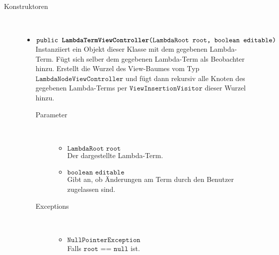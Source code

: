 \begin{description}
\item[Konstruktoren] \hfill \\
	\vspace{-.8cm}
	\begin{itemize}
		\item $\texttt{public \textbf{LambdaTermViewController}(LambdaRoot root, boolean editable)}$ \\ Instanziiert ein Objekt dieser Klasse mit dem gegebenen Lambda-Term. Fügt sich selber dem gegebenen Lambda-Term als Beobachter hinzu. Erstellt die Wurzel des View-Baumes vom Typ $\texttt{LambdaNodeViewController}$ und fügt dann rekursiv alle Knoten des gegebenen Lambda-Terms per $\texttt{ViewInsertionVisitor}$ dieser Wurzel hinzu.
		\begin{description}
			\item[Parameter] \hfill \\
			\vspace{-.8cm}
			\begin{itemize}
				\item $\texttt{LambdaRoot root}$ \\ Der dargestellte Lambda-Term.
				\item $\texttt{boolean editable}$ \\ Gibt an, ob Änderungen am Term durch den Benutzer zugelassen sind.
			\end{itemize}
			\item[Exceptions] \hfill \\
			\vspace{-.8cm}
			\begin{itemize}
				\item $\texttt{NullPointerException}$ \\ Falls $\texttt{root == null}$ ist.
			\end{itemize}
		\end{description}
	\end{itemize}
	

\end{description}
